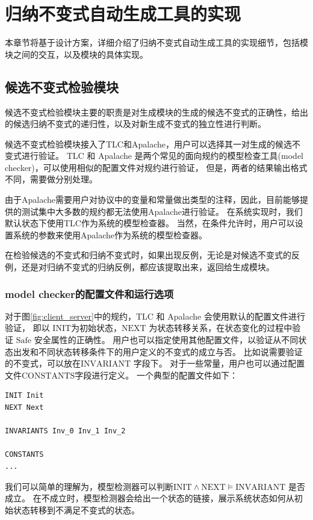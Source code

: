 \chapter{归纳不变式自动生成工具的实现}\label{chap:implementation}

本章节将基于设计方案，详细介绍了归纳不变式自动生成工具的实现细节，包括模块之间的交互，以及模块的具体实现。

\section{候选不变式检验模块}

候选不变式检验模块主要的职责是对生成模块的生成的候选不变式的正确性，给出的候选归纳不变式的递归性，以及对新生成不变式的独立性进行判断。

候选不变式检验模块接入了TLC和Apalache，用户可以选择其一对生成的候选不变式进行验证。
TLC 和 Apalache 是两个常见的面向\TLA 规约的模型检查工具(model checker)，可以使用相似的配置文件对规约进行验证，
但是，两者的结果输出格式不同，需要做分别处理。

由于Apalache需要用户对协议中的变量和常量做出类型的注释，因此，目前能够提供的测试集中大多数的规约都无法使用Apalache进行验证。
在系统实现时，我们默认状态下使用TLC作为系统的模型检查器。
当然，在条件允许时，用户可以设置系统的参数来使用Apalache作为系统的模型检查器。

在检验候选的不变式和归纳不变式时，如果出现反例，无论是对候选不变式的反例，还是对归纳不变式的归纳反例，都应该提取出来，返回给生成模块。

\subsection{model checker的配置文件和运行选项}

对于图\ref{fig:client_server}中的规约，TLC 和 Apalache 会使用默认的配置文件进行验证，
即以 $\text{INIT}$为初始状态，$\text{NEXT}$ 为状态转移关系，在状态变化的过程中验证 $\text{Safe}$ 安全属性的正确性。
用户也可以指定使用其他配置文件，以验证从不同状态出发和不同状态转移条件下的用户定义的不变式的成立与否。
比如说需要验证的不变式，可以放在$\text{INVARIANT}$ 字段下。
对于一些常量，用户也可以通过配置文件$\text{CONSTANTS}$字段进行定义。
一个典型的配置文件如下：
\begin{lstlisting}
INIT Init
NEXT Next

INVARIANTS Inv_0 Inv_1 Inv_2

CONSTANTS
...
\end{lstlisting}
我们可以简单的理解为，模型检测器可以判断$\text{INIT} \wedge \text{NEXT} \vDash \text{INVARIANT}$ 是否成立。
在不成立时，模型检测器会给出一个状态的链接，展示系统状态如何从初始状态转移到不满足不变式的状态。


